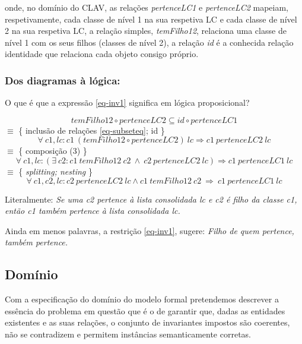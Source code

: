 \documentclass[tikz,runningheads,a4paper]{llncs}
\begin{document}
\noindent onde, no domínio do CLAV, as relações \textit{pertenceLC1} e \textit{pertenceLC2} mapeiam, respetivamente, cada classe de nível 1 na sua respetiva LC e cada classe de nível 2 na sua respetiva LC, a relação simples, \textit{temFilho12}, relaciona uma classe de nível 1 com os seus filhos (classes de nível 2), a relação \textit{id} é a conhecida relação identidade que relaciona cada objeto consigo próprio.

\subsubsection{Dos diagramas à lógica\cite{jno}\cite{jno-5}:}

O que é que a expressão \eqref{eq-inv1} significa em lógica proposicional?

\begin{equation*}
    temFilho12 \circ pertenceLC2 \subseteq id \circ pertenceLC1
\end{equation*}
$\equiv$ \{ inclusão de relações \eqref{eq-subseteq}; id \}
\begin{equation*}
    \forall\ c1, lc : c1\ (temFilho12 \circ pertenceLC2)\ lc \Rightarrow c1\ pertenceLC2\ lc
\end{equation*}
$\equiv$ \{ composição (3) \}
\begin{equation*}
    \forall\ c1, lc : (\exists\ c2 : c1\ temFilho12\ c2\ \land\ c2\ pertenceLC2\ lc) \Rightarrow c1\ pertenceLC1\ lc
\end{equation*}
$\equiv$ \{ \textit{splitting; nesting} \}
\begin{equation*}
    \forall\ c1, c2, lc : c2\ pertenceLC2\ lc \land c1\ temFilho12\ c2\ \Rightarrow \ c1\ pertenceLC1\ lc
\end{equation*}

\noindent Literalmente:
\vskip0.2cm
\textit{Se uma c2 pertence à lista consolidada lc e c2 é filho da classe c1, então c1 também pertence à lista consolidada lc.}

\vskip0.2cm
\noindent Ainda em menos palavras, a restrição \eqref{eq-inv1}, sugere:
\vskip0.2cm
\textit{Filho de quem pertence, também pertence.}

\subsection{Domínio}

Com a especificação do domínio do modelo formal pretendemos descrever a essência do problema em questão que é o de garantir que, dadas as entidades existentes e as suas relações, o conjunto de invariantes impostos são coerentes, não se contradizem e permitem instâncias semanticamente corretas.
\end{document}

